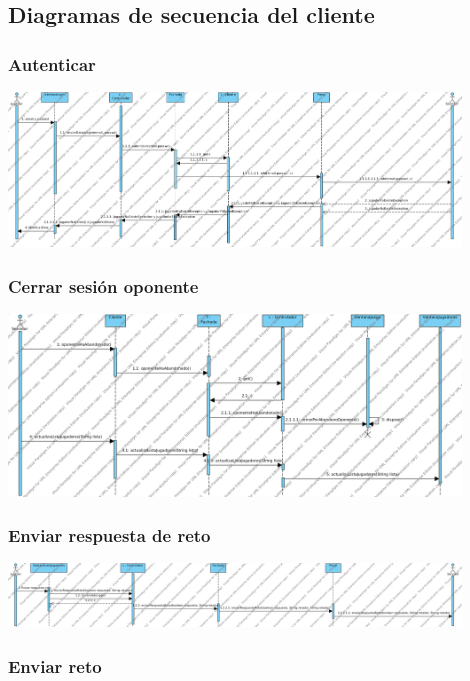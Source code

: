 \documentclass[a4paper,11pt,oneside]{article}
\begin{document}
\subsection{Diagramas de secuencia del cliente}

\subsubsection{Autenticar}

\includegraphics[width=0.9\textwidth]{img/ds_autenticar.png}\\[1cm]

\subsubsection{Cerrar sesión oponente}

\includegraphics[width=0.9\textwidth]{img/ds_CerrarSesionOponenteCliente.png}\\[1cm]

\subsubsection{Enviar respuesta de reto}

\includegraphics[width=0.9\textwidth]{img/ds_EnviarRespuestaRetoCliente.png}\\[1cm]

\subsubsection{Enviar reto}
\end{document}
